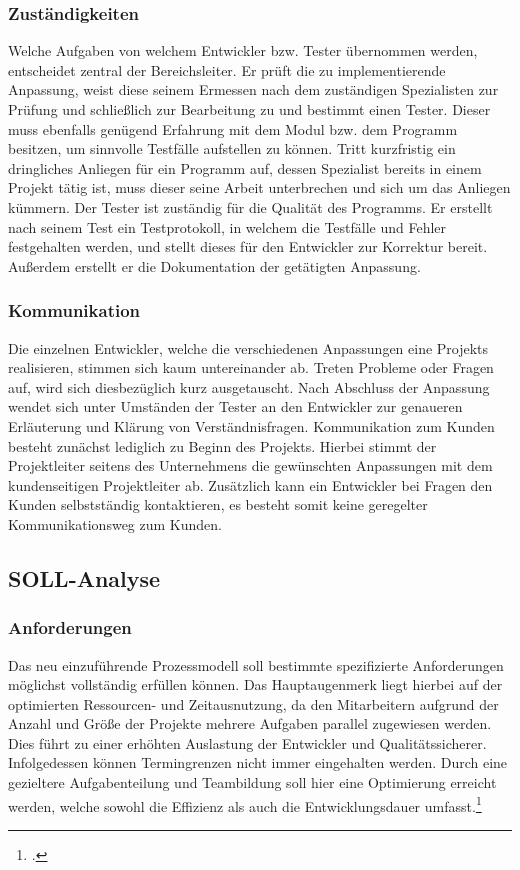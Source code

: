 \subsubsection{Zuständigkeiten}
Welche Aufgaben von welchem Entwickler bzw. Tester übernommen werden, entscheidet zentral der Bereichsleiter. Er prüft die zu implementierende Anpassung, weist diese seinem Ermessen nach dem zuständigen Spezialisten zur Prüfung und schließlich zur Bearbeitung zu und bestimmt einen Tester. Dieser muss ebenfalls genügend Erfahrung mit dem Modul bzw. dem Programm besitzen, um sinnvolle Testfälle aufstellen zu können. Tritt kurzfristig ein dringliches Anliegen für ein Programm auf, dessen Spezialist bereits in einem Projekt tätig ist, muss dieser seine Arbeit unterbrechen und sich um das Anliegen kümmern. Der Tester ist zuständig für die Qualität des Programms. Er erstellt nach seinem Test ein Testprotokoll, in welchem die Testfälle und Fehler festgehalten werden, und stellt dieses für den Entwickler zur Korrektur bereit. Außerdem erstellt er die Dokumentation der getätigten Anpassung.

\subsubsection{Kommunikation}
Die einzelnen Entwickler, welche die verschiedenen Anpassungen eine Projekts realisieren, stimmen sich kaum untereinander ab. Treten Probleme oder Fragen auf, wird sich diesbezüglich kurz ausgetauscht. Nach Abschluss der Anpassung wendet sich unter Umständen der Tester an den Entwickler zur genaueren Erläuterung und Klärung von Verständnisfragen. Kommunikation zum Kunden besteht zunächst lediglich zu Beginn des Projekts. Hierbei stimmt der Projektleiter seitens des Unternehmens die gewünschten Anpassungen mit dem kundenseitigen Projektleiter ab. Zusätzlich kann ein Entwickler bei Fragen den Kunden selbstständig kontaktieren, es besteht somit keine geregelter Kommunikationsweg zum Kunden.

\subsection{SOLL-Analyse}
\subsubsection{Anforderungen}
Das neu einzuführende Prozessmodell soll bestimmte spezifizierte Anforderungen möglichst vollständig erfüllen können. Das Hauptaugenmerk liegt hierbei auf der optimierten Ressourcen- und Zeitausnutzung, da den Mitarbeitern aufgrund der Anzahl und Größe der Projekte mehrere Aufgaben parallel zugewiesen werden. Dies führt zu einer erhöhten Auslastung der Entwickler und Qualitätssicherer. Infolgedessen können Termingrenzen nicht immer eingehalten werden. Durch eine gezieltere Aufgabenteilung und Teambildung soll hier eine Optimierung erreicht werden, welche sowohl die Effizienz als auch die Entwicklungsdauer umfasst.\footcite[Vgl.][]{interview}

